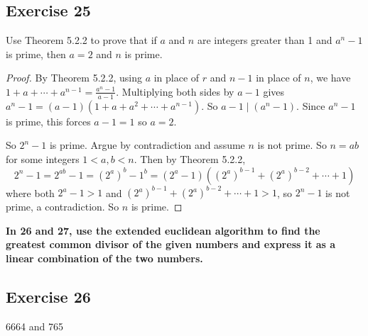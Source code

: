 \documentclass[14pt]{extarticle}
\newcommand{\cy}{\color{cyan}}
\begin{document}
\subsection{Exercise 25}
Use Theorem 5.2.2 to prove that if $a$ and $n$ are integers greater than 1 and \(a^n - 1\) is prime, then \(a = 2\) and
$n$ is prime.

\begin{proof}
        By Theorem 5.2.2, using $a$ in place of $r$ and \(n - 1\)
        in place of $n$, we have \(1 + a + \cdots + a^{n-1} =
        \frac{a^n-1}{a-1}\). Multiplying both sides by \(a - 1\) gives \(a^n - 1 = (a-1)(1 + a + a^2 + \cdots + a^{n-1})\).
        So \(a-1 \mid (a^n - 1)\). Since \(a^n-1\) is prime, this forces \(a-1 = 1\) so \(a = 2\).

        So \(2^n-1\) is prime. Argue by contradiction and assume $n$ is not prime. So \(n = ab\) for some integers
        \(1 < a,b < n\). Then by Theorem 5.2.2,
        \[
                2^{n} - 1 = 2^{ab} - 1 = (2^a)^b - 1^b = (2^a - 1)((2^a)^{b-1} + (2^a)^{b-2} + \cdots + 1)
        \]
        where both \(2^a-1 > 1\) and \((2^a)^{b-1} + (2^a)^{b-2} + \cdots + 1 > 1\), so \(2^n - 1\) is not prime, a
        contradiction. So $n$ is prime.
\end{proof}

{\bf \cy In 26 and 27, use the extended euclidean algorithm to find the greatest common divisor of the given numbers
and express it as a linear combination of the two numbers.}

\subsection{Exercise 26}
6664 and 765
\end{document}
